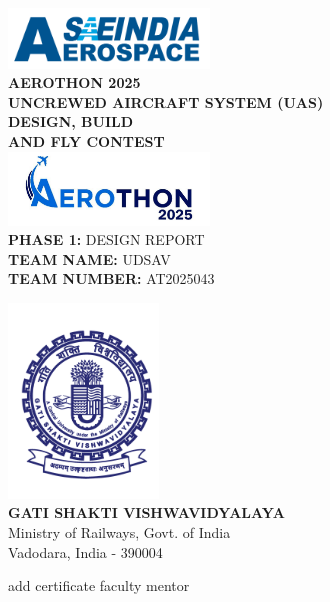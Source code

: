 \documentclass[12pt]{report}
\begin{document}
  \begin{center}
    \includegraphics[width=0.4\textwidth]{sae_aerospace.png}\\
    \vspace{1cm}
    \textbf{\LARGE AEROTHON 2025} \\
    \vspace{0.5in}
    \textbf{\Large UNCREWED AIRCRAFT SYSTEM  (UAS) \\
    DESIGN, BUILD \\ AND FLY CONTEST}\\
    \vspace{0.5cm}
    \includegraphics[width=0.4\textwidth]{aerothon2025.png}\\
    \vspace{0.5cm}
    \Large \textbf{PHASE 1:} DESIGN REPORT \\
    \vspace{0.5cm}
    \Large \textbf{TEAM NAME:} UDSAV \\
    \Large \textbf{TEAM NUMBER: } AT2025043
    
    \vspace{0.5cm}
    \includegraphics[width=0.3\textwidth]{gsvlogo.png}\\
    \vspace{0.5cm}
    \textbf{\Large GATI SHAKTI VISHWAVIDYALAYA} \\
    \large{Ministry of Railways, Govt. of India \\Vadodara, India - 390004}
  \end{center}
  \newpage
  add certificate faculty mentor 
  \newpage
\end{document}
